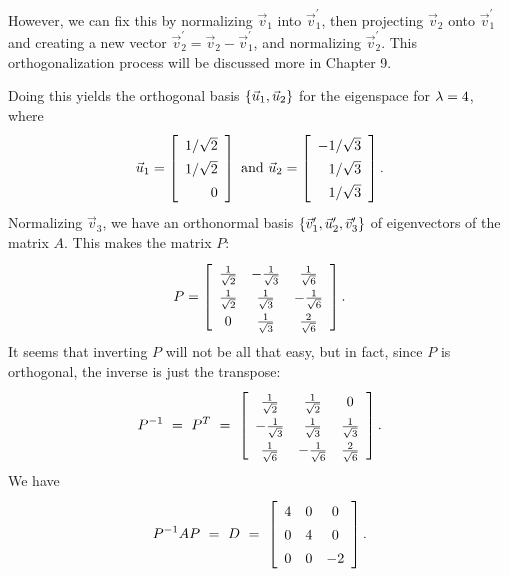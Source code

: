 \documentclass{ximera}
\begin{document}
\begin{solution}
  However, we can fix
  this by normalizing $\vec{v}_1$ into $\vec{v}_1^{\prime}$, then projecting $\vec{v}_2$ onto $\vec{v}_1^{\prime}$ and creating a new vector $\vec{v}_2^{\prime}=\vec{v}_2-\vec{v}_1^\prime$, and normalizing $\vec{v}_2^\prime$. This orthogonalization process will be discussed more in Chapter 9. 

  Doing this yields the orthogonal basis
  $\left\{\vec{u}_1,\vec{u}_2\right\}$ for the eigenspace for $\lambda=4$,
  where
  \begin{equation*}
    \vect{u}_1 = \startmat{r} 1/\sqrt{2} \\ 1/\sqrt{2} \\ 0 \stopmat
    \quad\mbox{and}\quad
    \vect{u}_2 = \startmat{r} -1/\sqrt{3} \\ 1/\sqrt{3} \\ 1/\sqrt{3} \stopmat.
\end{equation*}
Normalizing $\vec{v}_3$, we have an orthonormal basis
$\left\{\vec{v}_1^\prime,\vec{u}_2^\prime,\vec{v}_3^\prime\right\}$ of eigenvectors of the
matrix $A$. This makes the matrix $P$:
\begin{equation*}
    \def\arraystretch{1.4}
    P = \startmat{ccc}
      \frac{1}{\sqrt{2}} & -\frac{1}{\sqrt{3}} & \frac{1}{\sqrt{6}}  \\
      \frac{1}{\sqrt{2}} & \frac{1}{\sqrt{3}}  & -\frac{1}{\sqrt{6}} \\
      0                  & \frac{1}{\sqrt{3}}  & \frac{2}{\sqrt{6}}  \\
    \stopmat.
\end{equation*}
It seems that inverting $P$ will not be all that easy, but in fact,
since $P$ is orthogonal, the inverse is just the transpose:
\begin{equation*}
    \def\arraystretch{1.4}
    P^{-1}
    ~=~ P^T
    ~=~ \startmat{ccc}
      \frac{1}{\sqrt{2}}  & \frac{1}{\sqrt{2}}  & 0 \\
      -\frac{1}{\sqrt{3}} & \frac{1}{\sqrt{3}}  & \frac{1}{\sqrt{3}} \\
      \frac{1}{\sqrt{6}}  & -\frac{1}{\sqrt{6}} & \frac{2}{\sqrt{6}} \\
    \stopmat.
\end{equation*}
We have
\begin{equation*}
    P^{-1}AP
    ~=~ D
    ~=~ \startmat{ccc} 4 & 0 & 0 \\ 0 & 4 & 0 \\ 0 & 0 & -2 \stopmat.
\end{equation*}

\end{solution}
\end{document}
